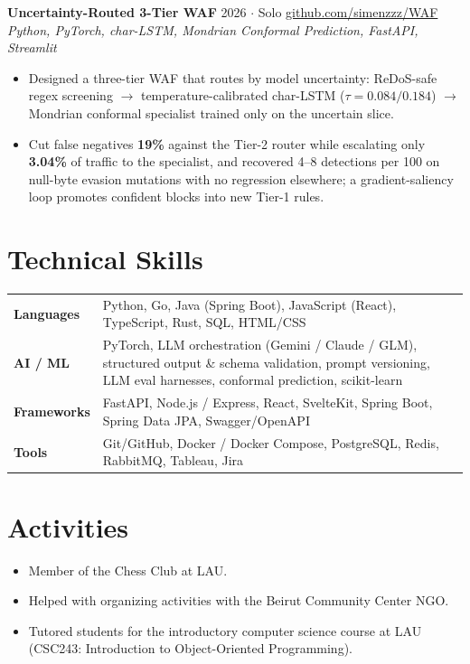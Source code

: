 \documentclass[11pt, a4paper]{article}
\begin{document}
\textbf{Uncertainty-Routed 3-Tier WAF} \hfill 2026 $\cdot$ Solo \quad
  \href{https://github.com/simenzzz/WAF}{github.com/simenzzz/WAF} \\
\textit{Python, PyTorch, char-LSTM, Mondrian Conformal Prediction, FastAPI, Streamlit}
\begin{itemize}
  \item Designed a three-tier WAF that routes by model uncertainty: ReDoS-safe regex
        screening $\to$ temperature-calibrated char-LSTM ($\tau=0.084/0.184$)
        $\to$ Mondrian conformal specialist trained only on the uncertain slice.
  \item Cut false negatives \textbf{19\%} against the Tier-2 router while escalating
        only \textbf{3.04\%} of traffic to the specialist, and recovered 4--8 detections
        per 100 on null-byte evasion mutations with no regression elsewhere;
        a gradient-saliency loop promotes confident blocks into new Tier-1 rules.
\end{itemize}

\section{Technical Skills}

\begin{tabularx}{\linewidth}{@{} l X}
  \textbf{Languages}   & Python, Go, Java (Spring Boot), JavaScript (React),
                          TypeScript, Rust, SQL, HTML/CSS \\
  \textbf{AI / ML}     & PyTorch, LLM orchestration (Gemini / Claude / GLM),
                          structured output \& schema validation, prompt versioning,
                          LLM eval harnesses, conformal prediction, scikit-learn \\
  \textbf{Frameworks}  & FastAPI, Node.js / Express, React, SvelteKit,
                          Spring Boot, Spring Data JPA, Swagger/OpenAPI \\
  \textbf{Tools}       & Git/GitHub, Docker / Docker Compose, PostgreSQL, Redis,
                          RabbitMQ, Tableau, Jira \\
\end{tabularx}

\section{Activities}

\begin{itemize}
  \item Member of the Chess Club at LAU.
  \item Helped with organizing activities with the Beirut Community Center NGO.
  \item Tutored students for the introductory computer science course at LAU
        (CSC243: Introduction to Object-Oriented Programming).
\end{itemize}
\end{document}

